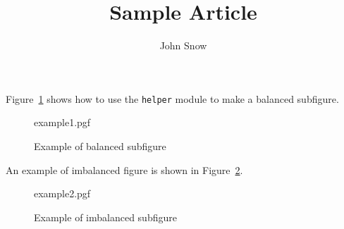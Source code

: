 


\usepackage{lua-visual-debug}
\usepackage{tikz}
\usepackage{pgfplots}

\title{Sample Article}
\author{John Snow}


\maketitle

Figure~\ref{fig:fig1} shows how to use the \texttt{helper} module to
make a balanced subfigure.

\begin{figure}[htbp]
  \centering
  {example1.pgf}
  \caption{Example of balanced subfigure}
  \label{fig:fig1}
\end{figure}

An example of imbalanced figure is shown in Figure~\ref{fig:fig2}.

\begin{figure}[htbp]
  \centering
  {example2.pgf}
  \caption{Example of imbalanced subfigure}
  \label{fig:fig2}
\end{figure}










